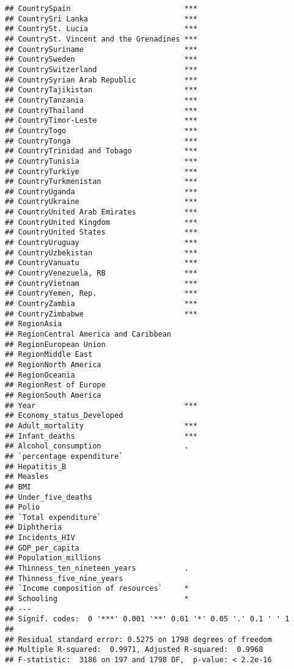 \documentclass[
]{article}
\begin{document}
\begin{verbatim}
## CountrySpain                          ***
## CountrySri Lanka                      ***
## CountrySt. Lucia                      ***
## CountrySt. Vincent and the Grenadines ***
## CountrySuriname                       ***
## CountrySweden                         ***
## CountrySwitzerland                    ***
## CountrySyrian Arab Republic           ***
## CountryTajikistan                     ***
## CountryTanzania                       ***
## CountryThailand                       ***
## CountryTimor-Leste                    ***
## CountryTogo                           ***
## CountryTonga                          ***
## CountryTrinidad and Tobago            ***
## CountryTunisia                        ***
## CountryTurkiye                        ***
## CountryTurkmenistan                   ***
## CountryUganda                         ***
## CountryUkraine                        ***
## CountryUnited Arab Emirates           ***
## CountryUnited Kingdom                 ***
## CountryUnited States                  ***
## CountryUruguay                        ***
## CountryUzbekistan                     ***
## CountryVanuatu                        ***
## CountryVenezuela, RB                  ***
## CountryVietnam                        ***
## CountryYemen, Rep.                    ***
## CountryZambia                         ***
## CountryZimbabwe                       ***
## RegionAsia                               
## RegionCentral America and Caribbean      
## RegionEuropean Union                     
## RegionMiddle East                        
## RegionNorth America                      
## RegionOceania                            
## RegionRest of Europe                     
## RegionSouth America                      
## Year                                  ***
## Economy_status_Developed                 
## Adult_mortality                       ***
## Infant_deaths                         ***
## Alcohol_consumption                   .  
## `percentage expenditure`                 
## Hepatitis_B                              
## Measles                                  
## BMI                                      
## Under_five_deaths                        
## Polio                                    
## `Total expenditure`                      
## Diphtheria                               
## Incidents_HIV                            
## GDP_per_capita                           
## Population_millions                      
## Thinness_ten_nineteen_years           .  
## Thinness_five_nine_years                 
## `Income composition of resources`     *  
## Schooling                             *  
## ---
## Signif. codes:  0 '***' 0.001 '**' 0.01 '*' 0.05 '.' 0.1 ' ' 1
## 
## Residual standard error: 0.5275 on 1798 degrees of freedom
## Multiple R-squared:  0.9971, Adjusted R-squared:  0.9968 
## F-statistic:  3186 on 197 and 1798 DF,  p-value: < 2.2e-16
\end{verbatim}
\end{document}
